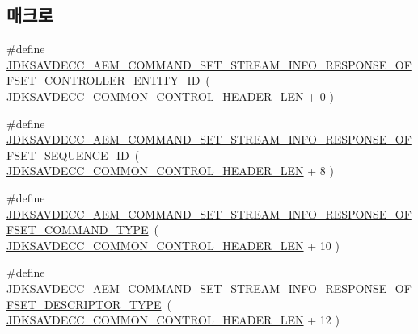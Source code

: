 \subsection*{매크로}
\begin{DoxyCompactItemize}
\item 
\#define \hyperlink{group__command__set__stream__info__response_ga923995b6cdf579807d0052164c953622}{J\+D\+K\+S\+A\+V\+D\+E\+C\+C\+\_\+\+A\+E\+M\+\_\+\+C\+O\+M\+M\+A\+N\+D\+\_\+\+S\+E\+T\+\_\+\+S\+T\+R\+E\+A\+M\+\_\+\+I\+N\+F\+O\+\_\+\+R\+E\+S\+P\+O\+N\+S\+E\+\_\+\+O\+F\+F\+S\+E\+T\+\_\+\+C\+O\+N\+T\+R\+O\+L\+L\+E\+R\+\_\+\+E\+N\+T\+I\+T\+Y\+\_\+\+ID}~( \hyperlink{group__jdksavdecc__avtp__common__control__header_gaae84052886fb1bb42f3bc5f85b741dff}{J\+D\+K\+S\+A\+V\+D\+E\+C\+C\+\_\+\+C\+O\+M\+M\+O\+N\+\_\+\+C\+O\+N\+T\+R\+O\+L\+\_\+\+H\+E\+A\+D\+E\+R\+\_\+\+L\+EN} + 0 )
\item 
\#define \hyperlink{group__command__set__stream__info__response_gadd9ae8c2624a3251af321c22d6dd9164}{J\+D\+K\+S\+A\+V\+D\+E\+C\+C\+\_\+\+A\+E\+M\+\_\+\+C\+O\+M\+M\+A\+N\+D\+\_\+\+S\+E\+T\+\_\+\+S\+T\+R\+E\+A\+M\+\_\+\+I\+N\+F\+O\+\_\+\+R\+E\+S\+P\+O\+N\+S\+E\+\_\+\+O\+F\+F\+S\+E\+T\+\_\+\+S\+E\+Q\+U\+E\+N\+C\+E\+\_\+\+ID}~( \hyperlink{group__jdksavdecc__avtp__common__control__header_gaae84052886fb1bb42f3bc5f85b741dff}{J\+D\+K\+S\+A\+V\+D\+E\+C\+C\+\_\+\+C\+O\+M\+M\+O\+N\+\_\+\+C\+O\+N\+T\+R\+O\+L\+\_\+\+H\+E\+A\+D\+E\+R\+\_\+\+L\+EN} + 8 )
\item 
\#define \hyperlink{group__command__set__stream__info__response_ga49b878117a1d222496cce057091cd089}{J\+D\+K\+S\+A\+V\+D\+E\+C\+C\+\_\+\+A\+E\+M\+\_\+\+C\+O\+M\+M\+A\+N\+D\+\_\+\+S\+E\+T\+\_\+\+S\+T\+R\+E\+A\+M\+\_\+\+I\+N\+F\+O\+\_\+\+R\+E\+S\+P\+O\+N\+S\+E\+\_\+\+O\+F\+F\+S\+E\+T\+\_\+\+C\+O\+M\+M\+A\+N\+D\+\_\+\+T\+Y\+PE}~( \hyperlink{group__jdksavdecc__avtp__common__control__header_gaae84052886fb1bb42f3bc5f85b741dff}{J\+D\+K\+S\+A\+V\+D\+E\+C\+C\+\_\+\+C\+O\+M\+M\+O\+N\+\_\+\+C\+O\+N\+T\+R\+O\+L\+\_\+\+H\+E\+A\+D\+E\+R\+\_\+\+L\+EN} + 10 )
\item 
\#define \hyperlink{group__command__set__stream__info__response_gadef0b1197a541f2951e6bebd63e974e3}{J\+D\+K\+S\+A\+V\+D\+E\+C\+C\+\_\+\+A\+E\+M\+\_\+\+C\+O\+M\+M\+A\+N\+D\+\_\+\+S\+E\+T\+\_\+\+S\+T\+R\+E\+A\+M\+\_\+\+I\+N\+F\+O\+\_\+\+R\+E\+S\+P\+O\+N\+S\+E\+\_\+\+O\+F\+F\+S\+E\+T\+\_\+\+D\+E\+S\+C\+R\+I\+P\+T\+O\+R\+\_\+\+T\+Y\+PE}~( \hyperlink{group__jdksavdecc__avtp__common__control__header_gaae84052886fb1bb42f3bc5f85b741dff}{J\+D\+K\+S\+A\+V\+D\+E\+C\+C\+\_\+\+C\+O\+M\+M\+O\+N\+\_\+\+C\+O\+N\+T\+R\+O\+L\+\_\+\+H\+E\+A\+D\+E\+R\+\_\+\+L\+EN} + 12 )

\end{DoxyCompactItemize}
